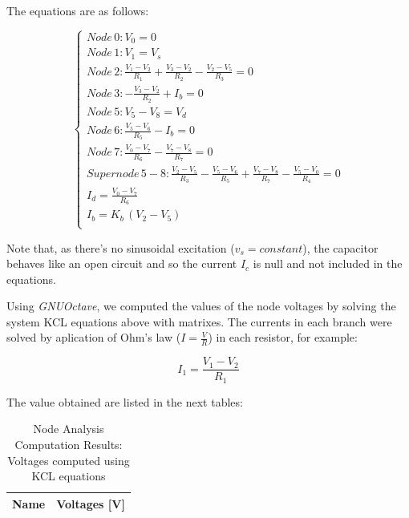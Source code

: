 The equations are as follows:

\begin{equation} 
\begin{cases}

    Node\, 0: V_0 = 0 \\
    Node\, 1: V_1 = V_s \\
    Node\, 2: \frac{V_1 - V_2}{R_1} + \frac{V_3 - V_2}{R_2} - \frac{V_2 - V_5}{R_3} = 0 \\
    Node\, 3: -\frac{V_3 - V_2}{R_2} + I_b = 0 \\
    Node\, 5: V_5 - V_8 = V_d \\
    Node\, 6: \frac{V_5 - V_6}{R_5} - I_b = 0 \\
    Node\, 7: \frac{V_0 - V_7}{R_6} - \frac{V_7 - V_8}{R_7} = 0 \\
    Supernode\, 5-8: \frac{V_2 - V_5}{R_3} - \frac{V_5 - V_6}{R_5} + \frac{V_7 - V_8}{R_7} - \frac{V_5 - V_0}{R_4} = 0 \\
    I_d = \frac{V_0 - V_7}{R_6} \\
    I_b = K_b\,(V_2 - V_5) \\
    
\end{cases}
\label{eq:1}
\end{equation}


Note that, as there's no sinusoidal excitation ($v_s = constant$), the capacitor behaves like an open circuit and so the current $I_c$ is null and not included in the equations.


Using \textit{GNUOctave}, we computed the values of the node voltages by solving the system KCL equations above with matrixes. The currents in each branch were solved by aplication of Ohm's law ($I = \frac{V}{R}$) in each resistor, for example:

\begin{center}
  \begin{equation}
    I_1 = \frac{V_1 - V_2}{R_1}
  \end{equation} 
\end{center}

\newpage

The value obtained are listed in the next tables:


\begin{table}[h]
  \centering
  \begin{tabular}{|l|r|}
    \hline    
    {\bf Name} & {\bf Voltages [V]} \\ \hline
    
  \end{tabular}
  \caption{Node Analysis Computation Results: Voltages computed using KCL equations}
  \label{tab:nodeVoltages1}
\end{table}


